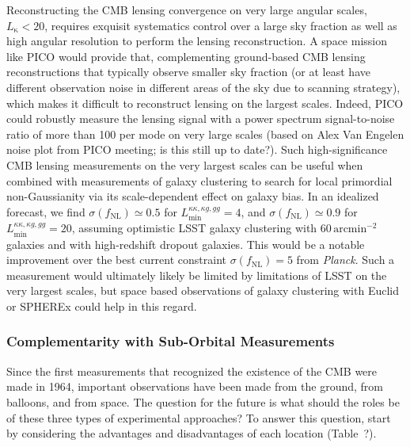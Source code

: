 \documentclass[PICOReport.tex]{subfiles}
\begin{document}
 Reconstructing the CMB lensing convergence on very large angular scales, $L_\mathrm{\kappa}<20$, requires exquisit systematics control over a large sky fraction as well as high angular resolution to perform the lensing reconstruction. 
 A space mission like PICO would provide that, complementing ground-based CMB lensing reconstructions that typically observe smaller sky fraction (or at least have different observation noise in different areas of the sky due to scanning strategy), which makes it difficult to reconstruct lensing on the largest scales. 
 Indeed,  PICO could robustly measure the lensing signal with a power spectrum signal-to-noise ratio of more than 100 per mode on very large scales (based on Alex Van Engelen noise plot from PICO meeting; is this still up to date?).
 Such high-significance CMB lensing measurements on the very largest scales can be useful when combined with measurements of  galaxy clustering to search for local primordial non-Gaussianity via its scale-dependent effect on galaxy bias.
 In an idealized forecast, we find $\sigma(f_\mathrm{NL})\simeq 0.5$ for $L_\mathrm{min}^{\kappa\kappa,\kappa g,gg}=4$, and $\sigma(f_\mathrm{NL})\simeq 0.9$ for $L_\mathrm{min}^{\kappa\kappa,\kappa g,gg}=20$, assuming optimistic LSST galaxy clustering with $60\,\mathrm{arcmin}^{-2}$ galaxies and with high-redshift dropout galaxies.
 This would be a notable improvement over the best current constraint $\sigma(f_\mathrm{NL})=5$ from {\it Planck}.
 Such a measurement would ultimately likely be limited by limitations of LSST on the very largest scales, but space based observations of galaxy clustering with Euclid or SPHEREx could help in this regard.


 \subsubsection{Complementarity with Sub-Orbital Measurements}


 Since the first measurements that recognized the existence of the CMB were made in 1964, important observations have been made from the ground, from balloons, and from space.  The question for the future is what should the roles be of these three types of experimental approaches?  To answer this question, start by considering the advantages and disadvantages of each location (Table~?).
\end{document}
